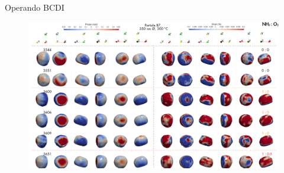 \begin{frame}{Operando BCDI}

    \begin{figure}
        \centering
        \includegraphics[width=\textwidth]{Figures/bcdi_data/OperandoBCDI.png}
        \label{fig:operando_bcdi}
    \end{figure}
    
\end{frame}
